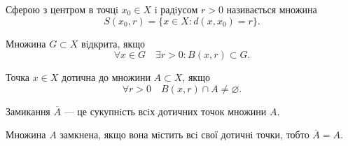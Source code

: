 \begin{definition}[Сфера]
    Сферою з центром в точцi $x_0 \in X$ i радiусом $r > 0$ називається множина
    $$S(x_0, r) = \{x \in X: d(x, x_0) = r\}.$$
\end{definition}

\begin{definition}
    Множина $G \subset X$ вiдкрита, якщо 
    $$\forall x \in  G \quad \exists r > 0: B(x, r) \subset G.$$
\end{definition}

\begin{definition}
    Точка $x \in X$ дотична до множини $A \subset X$, якщо
    $$\forall r > 0 \quad B(x, r) \cap A \neq \varnothing.$$
\end{definition}

\begin{definition}[Замикання]
    Замикання $\overline{A}$ --- це сукупнiсть всiх дотичних точок множини $A$.
\end{definition}

\begin{definition}
    Множина $A$ замкнена, якщо вона мiстить всi свої дотичнi точки, тобто
    $\overline{A} = A$.
\end{definition}


